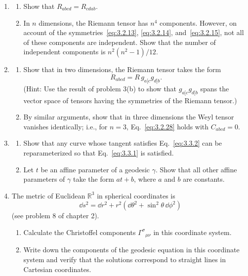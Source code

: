 \begin{enumerate}[label=\arabic*.,leftmargin=*]
\item
  \begin{enumerate}[label=\alph*),leftmargin=2em]
  \item Show that $R_{abcd}=R_{cdab}$.
  \item In $n$ dimensions, the Riemann tensor has $n^4$ components. However, on account
  of the symmetries~\eqref{eq:3.2.13}, \eqref{eq:3.2.14}, and~\eqref{eq:3.2.15}, not all of these components are
  independent. Show that the number of independent components is $n^2(n^2-1)/12$.
  \end{enumerate}

\item
  \begin{enumerate}[label=\alph*),leftmargin=2em]
  \item Show that in two dimensions, the Riemann tensor takes the form
  \[
    R_{abcd}=R\,g_{a[c}g_{d]b}.
  \]
  (Hint: Use the result of problem 3(b) to show that $g_{a[c}g_{d]b}$ spans the
  vector space of tensors having the symmetries of the Riemann tensor.)
  \item By similar arguments, show that in three dimensions the Weyl tensor vanishes
  identically; i.e., for $n=3$, Eq.~\eqref{eq:3.2.28} holds with $C_{abcd}=0$.
  \end{enumerate}

\item
  \begin{enumerate}[label=\alph*),leftmargin=2em]
  \item Show that any curve whose tangent satisfies Eq.~\eqref{eq:3.3.2} can be reparameterized
  so that Eq.~\eqref{eq:3.3.1} is satisfied.
  \item Let $t$ be an affine parameter of a geodesic $\gamma$. Show that all other affine
  parameters of $\gamma$ take the form $at+b$, where $a$ and $b$ are constants.
  \end{enumerate}

\item The metric of Euclidean $\mathbb R^3$ in spherical coordinates is
\[
  \dd s^2=\dd r^2+r^2(\dd\theta^2+\sin^2\theta\,\dd\phi^2)
\]
(see problem 8 of chapter 2).
  \begin{enumerate}[label=\alph*),leftmargin=2em]
  \item Calculate the Christoffel components $\Gamma^\sigma{}_{\mu\nu}$ in this coordinate system.
  \item Write down the components of the geodesic equation in this coordinate system
  and verify that the solutions correspond to straight lines in Cartesian coordinates.
  \end{enumerate}


\end{enumerate}
